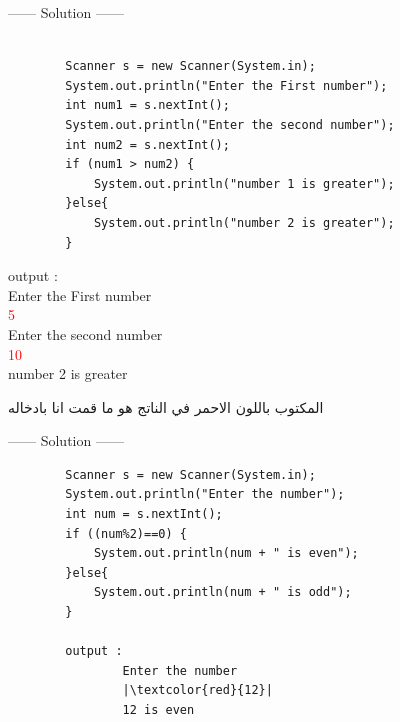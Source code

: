   \begin{minipage}[h]{1\textwidth}
  \begin{example}
    \begin{center}
      ------ \textcolor{Solution}{Solution} ------ 
    \end{center} 
    \begin{verbatim}

        Scanner s = new Scanner(System.in);
        System.out.println("Enter the First number");
        int num1 = s.nextInt();
        System.out.println("Enter the second number");
        int num2 = s.nextInt();
        if (num1 > num2) {
            System.out.println("number 1 is greater");
        }else{
            System.out.println("number 2 is greater");
        }
      \end{verbatim}
\smallskip
      output :\\  
                Enter the First number\\
                \textcolor{red}{5}\\
                Enter the second number\\
                \textcolor{red}{10}\\
                number 2 is greater\\
    
  
  \end{example}
  \end{minipage} 
  \begin{AR}
    المكتوب باللون الاحمر في الناتج هو ما قمت انا بادخاله
  \end{AR}
  
    \begin{example}
      
      \begin{center}
        ------ \textcolor{Solution}{Solution} ------ 
      \end{center} 

      \begin{verbatim}
        Scanner s = new Scanner(System.in);
        System.out.println("Enter the number");
        int num = s.nextInt();
        if ((num%2)==0) {
            System.out.println(num + " is even");
        }else{
            System.out.println(num + " is odd");
        }

        output : 
                Enter the number
                |\textcolor{red}{12}|
                12 is even
      \end{verbatim}
    \end{example}
  

